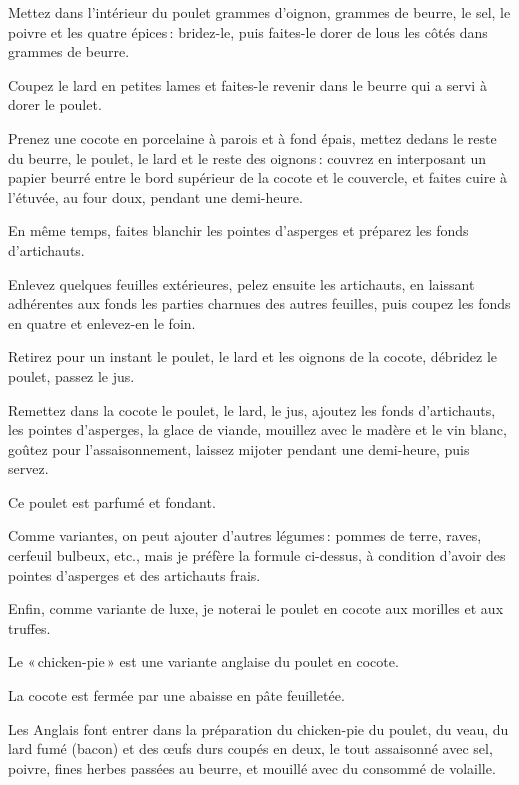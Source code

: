 Mettez dans l'intérieur du poulet {\mmm} grammes d’oignon, {\mmm}
grammes de beurre, le sel, le poivre et les quatre épices : bridez-le, puis
faites-le dorer de lous les côtés dans {\mmm} grammes de beurre.

Coupez le lard en petites lames et faites-le revenir dans le beurre qui a servi
à dorer le poulet.

Prenez une cocote en porcelaine à parois et à fond épais, mettez dedans le
reste du beurre, le poulet, le lard et le reste des oignons : couvrez en
interposant un papier beurré entre le bord supérieur de la cocote et le
couvercle, et faites cuire à l'étuvée, au four doux, pendant une demi-heure.

En même temps, faites blanchir les pointes d'asperges et préparez les fonds
d'artichauts.

Enlevez quelques feuilles extérieures, pelez ensuite les artichauts, en
laissant adhérentes aux fonds les parties charnues des autres feuilles, puis
coupez les fonds en quatre et enlevez-en le foin.

Retirez pour un instant le poulet, le lard et les oignons de la cocote,
débridez le poulet, passez le jus.

Remettez dans la cocote le poulet, le lard, le jus, ajoutez les fonds
d'artichauts, les pointes d'asperges, la glace de viande, mouillez avec le
madère et le vin blanc, goûtez pour l'assaisonnement, laissez mijoter pendant
une demi-heure, puis servez.

Ce poulet est parfumé et fondant.

\sk

Comme variantes, on peut ajouter d'autres légumes : pommes de terre, raves,
cerfeuil bulbeux, etc., mais je préfère la formule ci-dessus, à condition
d'avoir des pointes d'asperges et des artichauts frais.

\sk

Enfin, comme variante de luxe, je noterai le poulet en cocote aux morilles et
aux truffes.

\sk

\label{pg0548} \hypertarget{p0548}{}
Le « chicken-pie » est une variante anglaise du poulet en cocote.

La cocote est fermée par une abaisse en pâte feuilletée.

Les Anglais font entrer dans la préparation du chicken-pie du poulet, du veau,
du lard fumé (bacon) et des œufs durs coupés en deux, le tout assaisonné avec
sel, poivre, fines herbes passées au beurre, et mouillé avec du consommé de
volaille.

